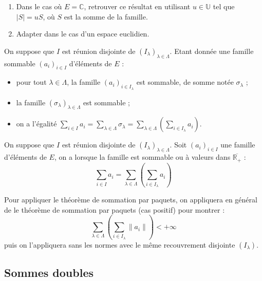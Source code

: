 \documentclass[french]{article}
\newcommand{\R}{\mathbb{R}}
\newcommand{\C}{\mathbb{C}}
\newcommand{\U}{\mathbb{U}}
\theoremstyle{plain}
\theoremstyle{definition}
\theoremstyle{remark}
\begin{document}
\begin{exo}
	\begin{enumerate}
		\item Dans le cas où $E=\C$, retrouver ce résultat en utilisant $u\in\U$ tel que $\lvert S\rvert=uS$, où $S$ est la somme de la famille.
		\item Adapter dans le cas d'un espace euclidien.
	\end{enumerate}
\end{exo}

\begin{thm}%
	On suppose que $I$ est réunion disjointe de $(I_\lambda)_{\lambda\in\Lambda}$. Etant donnée une famille sommable $(a_i)_{i\in I}$ d'éléments de $E$ : 
	\begin{itemize}
		\item pour tout $\lambda\in\Lambda$, la famille $(a_i)_{i\in I_\lambda}$ est sommable, de somme notée $\sigma_\lambda$ ;
		\item la famille $(\sigma_\lambda)_{\lambda\in\Lambda}$ est sommable ;
		\item on a l'égalité $\displaystyle\sum_{i\in I}a_i=\sum_{\lambda\in\Lambda}\sigma_\lambda=\displaystyle\sum_{\lambda\in\Lambda}\left(\sum_{i\in I_\lambda}a_i\right)$.
	\end{itemize}
\end{thm}

\begin{met}
	On suppose que $I$ est réunion disjointe de $(I_\lambda)_{\lambda\in\Lambda}$. Soit $(a_i)_{i\in I}$ une famille d'éléments de $E$, on a lorsque la famille est sommable ou à valeurs dans $\overline{\R_+}$ : $$\sum_{i\in I}a_i=\sum_{\lambda\in\Lambda}\left(\sum_{i\in I_\lambda}a_i\right)$$
\end{met}

\begin{met}
	Pour appliquer le théorème de sommation par paquets, on appliquera en général de le théorème de sommation par paquets (cas positif) pour montrer : $$\sum_{\lambda\in\Lambda}\left(\sum_{i\in I_\lambda}\lVert a_i\rVert\right)<+\infty$$ puis on l'appliquera sans les normes avec le même recouvrement disjointe $(I_\lambda)$.
\end{met}

\subsection{Sommes doubles}
\end{document}
